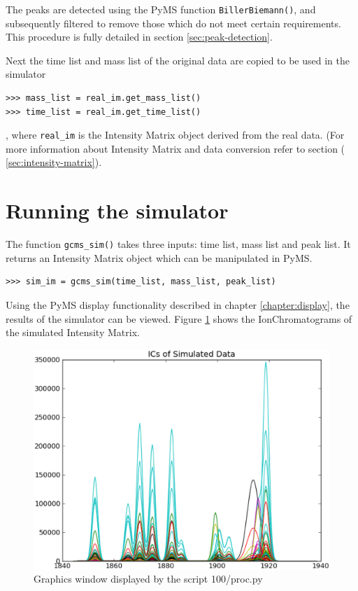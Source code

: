 The peaks are detected using the PyMS function {\tt BillerBiemann()}, and subsequently
filtered to remove those which do not meet certain requirements. This procedure is
fully detailed in section \ref{sec:peak-detection}.

Next the time list and mass list of the original data are copied to be used in the
simulator 
\begin{verbatim}
>>> mass_list = real_im.get_mass_list()
>>> time_list = real_im.get_time_list()
\end{verbatim}

, where {\tt real\_im} is the Intensity Matrix object derived from the real data. (For
more information about Intensity Matrix and data conversion refer to section (
\ref{sec:intensity-matrix}).

\section{Running the simulator}
The function {\tt gcms\_sim()} takes three inputs: time list, mass list and peak list.
It returns an Intensity Matrix object which can be manipulated in PyMS.

\begin{verbatim}
>>> sim_im = gcms_sim(time_list, mass_list, peak_list)
\end{verbatim}

Using the PyMS display functionality described in chapter \ref{chapter:display}, the results of 
the simulator can be viewed. Figure \ref{fig:no-noise} shows the IonChromatograms of the 
simulated Intensity Matrix.

\begin{figure}[h]
  \begin{center}
    \includegraphics[scale=0.25]{graphics/chapter10/test-100.eps}
  \end{center}
  \caption{Graphics window displayed by the script 100/proc.py}
  \label{fig:no-noise}
\end{figure}

